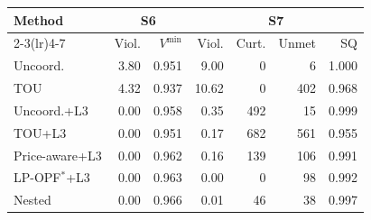\begin{tabular}{@{}lrrrrrr@{}}
\toprule
Method & \multicolumn{2}{c}{S6} & \multicolumn{4}{c}{S7} \\
\cmidrule(lr){2-3}\cmidrule(lr){4-7}
 & Viol. & $V^{\min}$ & Viol. & Curt. & Unmet & SQ \\
\midrule
Uncoord. & 3.80 & 0.951 & 9.00 & 0 & 6 & 1.000 \\
TOU & 4.32 & 0.937 & 10.62 & 0 & 402 & 0.968 \\
Uncoord.+L3 & 0.00 & 0.958 & 0.35 & 492 & 15 & 0.999 \\
TOU+L3 & 0.00 & 0.951 & 0.17 & 682 & 561 & 0.955 \\
Price-aware+L3 & 0.00 & 0.962 & 0.16 & 139 & 106 & 0.991 \\
LP-OPF$^\ast$+L3 & 0.00 & 0.963 & 0.00 & 0 & 98 & 0.992 \\
Nested & 0.00 & 0.966 & 0.01 & 46 & 38 & 0.997 \\
\bottomrule
\end{tabular}
